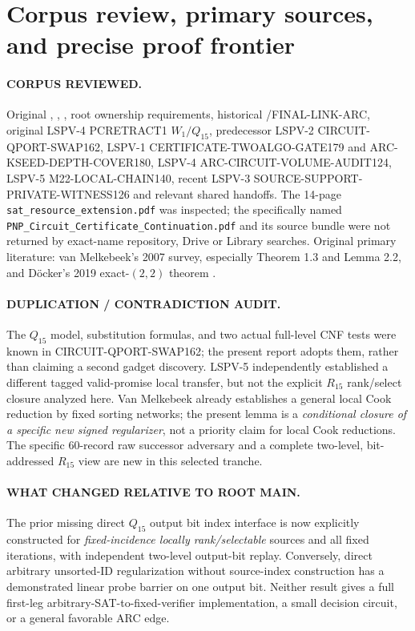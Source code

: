 \documentclass[11pt]{article}
\begin{document}
\section{Corpus review, primary sources, and precise proof frontier}
\paragraph{CORPUS REVIEWED.} Original , , , root  ownership requirements, historical /FINAL-LINK-ARC, original LSPV-4 PCRETRACT1 $W_1/Q_{15}$, predecessor LSPV-2 CIRCUIT-QPORT-SWAP162, LSPV-1 CERTIFICATE-TWOALGO-GATE179 and ARC-KSEED-DEPTH-COVER180, LSPV-4 ARC-CIRCUIT-VOLUME-AUDIT124, LSPV-5 M22-LOCAL-CHAIN140, recent LSPV-3 SOURCE-SUPPORT-PRIVATE-WITNESS126 and relevant shared handoffs. The 14-page \texttt{sat\_resource\_extension.pdf} was inspected; the specifically named \texttt{PNP\_Circuit\_Certificate\_Continuation.pdf} and its source bundle were not returned by exact-name repository, Drive or Library searches. Original primary literature: van Melkebeek's 2007 survey, especially Theorem 1.3 and Lemma 2.2, and D\"ocker's 2019 exact-$(2,2)$ theorem \cite{vm,doecker}.
\paragraph{DUPLICATION / CONTRADICTION AUDIT.} The $Q_{15}$ model, substitution formulas, and two actual full-level CNF tests were known in CIRCUIT-QPORT-SWAP162; the present report adopts them, rather than claiming a second gadget discovery. LSPV-5 independently established a different tagged valid-promise local transfer, but not the explicit $R_{15}$ rank/select closure analyzed here. Van Melkebeek already establishes a general local Cook reduction by fixed sorting networks; the present lemma is a \emph{conditional closure of a specific new signed regularizer}, not a priority claim for local Cook reductions. The specific $60$-record raw successor adversary and a complete two-level, bit-addressed $R_{15}$ view are new in this selected tranche.
\paragraph{WHAT CHANGED RELATIVE TO ROOT MAIN.} The prior missing direct $Q_{15}$ output bit index interface is now explicitly constructed for \emph{fixed-incidence locally rank/selectable} sources and all fixed iterations, with independent two-level output-bit replay. Conversely, direct arbitrary unsorted-ID regularization without source-index construction has a demonstrated linear probe barrier on one output bit. Neither result gives a full first-leg arbitrary-SAT-to-fixed-verifier implementation, a small decision circuit, or a general favorable ARC edge.
\end{document}
